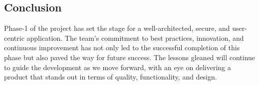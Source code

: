 \documentclass[11pt]{article}
\begin{document}
\subsection{Conclusion}
\label{sec:org432efb4}

Phase-1 of the project has set the stage for a well-architected, secure, and
user-centric application. The team's commitment to best practices, innovation,
and continuous improvement has not only led to the successful completion of this
phase but also paved the way for future success. The lessons gleaned will
continue to guide the development as we move forward, with an eye on delivering
a product that stands out in terms of quality, functionality, and design.
\end{document}
